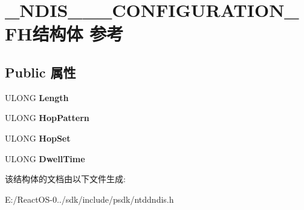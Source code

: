 \hypertarget{struct___n_d_i_s__802__11___c_o_n_f_i_g_u_r_a_t_i_o_n___f_h}{}\section{\+\_\+\+N\+D\+I\+S\+\_\+\_\+\_\+\+C\+O\+N\+F\+I\+G\+U\+R\+A\+T\+I\+O\+N\+\_\+\+F\+H结构体 参考}
\label{struct___n_d_i_s__802__11___c_o_n_f_i_g_u_r_a_t_i_o_n___f_h}
\subsection*{Public 属性}
\begin{DoxyCompactItemize}
\item 
\mbox{\label{struct___n_d_i_s__802__11___c_o_n_f_i_g_u_r_a_t_i_o_n___f_h_a6d781c532ba763f7fcf5f3cb56d9ad3e}} 
U\+L\+O\+NG {\bfseries Length}
\item 
\mbox{\label{struct___n_d_i_s__802__11___c_o_n_f_i_g_u_r_a_t_i_o_n___f_h_a682eb6b100089fa3dc20dcd223daf503}} 
U\+L\+O\+NG {\bfseries Hop\+Pattern}
\item 
\mbox{\label{struct___n_d_i_s__802__11___c_o_n_f_i_g_u_r_a_t_i_o_n___f_h_adb29524fa576ab6e0699b5999683510f}} 
U\+L\+O\+NG {\bfseries Hop\+Set}
\item 
\mbox{\label{struct___n_d_i_s__802__11___c_o_n_f_i_g_u_r_a_t_i_o_n___f_h_ac037d165443ab1a16f3458e64d605beb}} 
U\+L\+O\+NG {\bfseries Dwell\+Time}
\end{DoxyCompactItemize}


该结构体的文档由以下文件生成\+:\begin{DoxyCompactItemize}
\item 
E\+:/\+React\+O\+S-\/0../sdk/include/psdk/ntddndis.\+h\end{DoxyCompactItemize}
